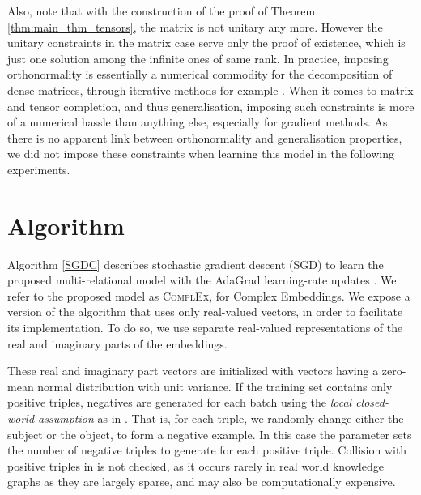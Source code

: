 \documentclass[twoside,11pt]{article}
\renewcommand{\cite}{\citep}
\begin{document}
Also, note that
with the construction of the proof of Theorem \ref{thm:main_thm_tensors},
the matrix 
is not unitary any more. 
However the unitary constraints in the matrix case serve only
the proof of existence, which is just one solution among the
infinite ones of same rank. 
In practice, imposing orthonormality is essentially a numerical 
commodity for the decomposition of dense matrices,
through iterative methods for example \cite{saad1992numerical}.
When it comes to matrix and tensor completion, and
thus generalisation, imposing such constraints is more of
a numerical hassle than anything else, especially for
gradient methods. As there is no apparent link
between orthonormality and generalisation properties,
we did not impose these constraints when learning this model 
in the following experiments.


























\section{Algorithm}
\label{sec:algo}

Algorithm \ref{SGDC} describes stochastic gradient descent (SGD) to learn the proposed 
multi-relational model with the AdaGrad learning-rate updates \cite{duchi2011adaptive}. 
We refer to the proposed model as \textsc{ComplEx}, for Complex Embeddings.
We expose a version of the algorithm that uses only real-valued vectors, in order 
to facilitate its implementation. To do so, we use separate real-valued representations of the
real and imaginary parts of the embeddings.


These real and imaginary part vectors are 
initialized with vectors having a zero-mean normal distribution with unit variance.
If the training set  contains only positive triples, negatives are generated for
each batch using the \emph{local closed-world assumption} as in \citet{bordes2013translating}. 
That is, for each triple, we randomly change either the subject or the object, 
to form a negative example.
In this case the parameter  sets the number of negative triples
to generate for each positive triple. Collision with positive triples in 
is not checked, as it occurs rarely in real world knowledge graphs as they are largely sparse,
and may also be computationally expensive.
\end{document}

